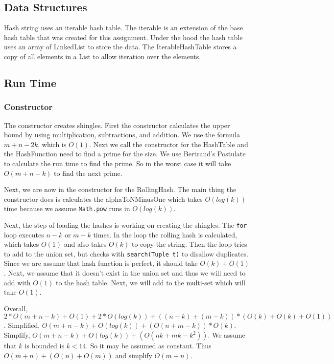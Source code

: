 \documentclass[10pt,letterpaper]{article}
\begin{document}
\subsection{Data Structures}
Hash string uses an iterable hash table. The iterable is an extension of the base hash table that was created for this
assignment. Under the hood the hash table uses an array of LinkedList to store the data. The IterableHashTable stores
a copy of all elements in a List to allow iteration over the elements.
\subsection{Run Time}
\subsubsection{Constructor}
The constructor creates shingles. First the constructor calculates the upper bound by using multiplication, subtractions, and addition. We use the formula $m+n-2k$, which is $O(1)$.
Next we call the constructor for the HashTable and the HashFunction need to find a prime for the size. We use Bertrand's Postulate to calculate the run time to find the prime. So in the worst case it will take $O(m+n-k)$ to find the next prime.

Next, we are now in the constructor for the RollingHash. The main thing the constructor does is
calculates the alphaToNMinusOne which takes $O(log(k))$ time because we assume \texttt{Math.pow} runs in $O(log(k))$.

Next, the step of loading the hashes is working on creating the shingles. The \texttt{for} loop executes $n-k$ or $m-k$ times. In the loop the rolling hash is calculated, which takes $O(1)$ and also takes $O(k)$ to copy the string. Then the loop tries to add to the union set, but checks with \texttt{search(Tuple t)} to disallow duplicates. Since we are assume that hash function is perfect, it should take $O(k) + O(1)$. Next, we assume that it doesn't exist in the union set and thus we will need to add with $O(1)$ to the hash table. Next, we will add to the multi-set which will take $O(1)$. 

Overall, $2*O(m+n-k)+O(1)+2*O(log(k))+((n-k)+(m-k))*(O(k)+O(k)+O(1))$. 
Simplified, $O(m+n-k)+O(log(k))+(O(n+m-k))*O(k)$. 
Simplify, $O(m+n-k)+O(log(k))+(O(nk+mk-k^2))$. We assume that $k$ is bounded is $k<14$. So it may be assumed as constant.
Thus $O(m+n)+(O(n)+O(m))$ and simplify $O(m+n)$.
\end{document}

